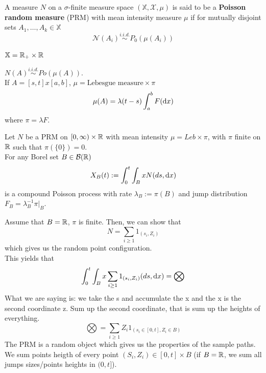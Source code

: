 \documentclass{article}
\begin{document}
	\begin{definition}
		A measure $N$ on a $\sigma$-finite measure space $(\mathbb{X}, \mathcal{X}, \mu)$ is said to be a \textbf{Poisson random measure} (PRM) with mean intensity measure $\mu$ if for mutually disjoint sets $A_1,\dots,A_k \in\mathbb{X} $
		$$\mathcal{N}(A_i) \stackrel{i.i.d.} \sim  P_0(\mu(A_i))$$
	\end{definition} 
	\begin{example}
		$\mathbb{X} = \mathbb{R}_+ \times \mathbb{R}$
		\begin{figure}[H]
			\centering
			
		\end{figure}
		$N(A) \stackrel{i.i.d.} \sim Po(\mu(A))$. \\
		If $A = [s,t] x [a,b] $, $\mu = \text{Lebesgue measure} \times \pi$
		\begin{equation*}
			\mu(A) = \lambda(t-s) \int_a^bF(\mathop{}\!\mathrm{d} x)
		\end{equation*}
		where $\pi = \lambda F$. 
	\end{example}
	\begin{proposition}
		 Let $N$ be a PRM on $[0,\infty) \times \mathbb{R}$ with mean intensity $\mu=Leb \times \pi$, with $\pi$ finite on $\mathbb{R}$ such that $\pi(\{0\}) = 0$. \\
		For any Borel set $B \in \mathcal{B}(\mathbb{R})$ 
		\begin{equation*}
			X_B(t):= \int_0^t \int_B x N(ds,\mathop{}\!\mathrm{d} x) 
		\end{equation*}
		is a compound Poisson process with rate $\lambda_B:= \pi(B)$ and jump distribution $F_B = \lambda_B^{-1} \pi|_B$. 
	\end{proposition}
	\begin{example}
		Assume that $B = \mathbb{R}$, $\pi$ is finite. Then, we can show that 
		\begin{equation*}
			N = \sum_{i \geq 1}1_{(s_i,Z_i)}
		\end{equation*}
		which gives us the random point configuration.\\
		This yields that 
		\begin{equation*}
			\int_0^t \int_B x \sum_{i \geq 1}1_{(s_i,Z_i)} (ds,\mathop{}\!\mathrm{d} x) = \bigotimes
		\end{equation*}
		What we are saying is: we take the s and accumulate the x and the x is the second coordinate z. Sum up the second coordinate, that is sum up the heights of everything.
		$$\bigotimes = \sum_{i\geq1} Z_i 1_{(s_i \in [0,t], Z_i \in B)}$$
		The PRM is a random object which gives us the properties of the sample paths.\\
		We sum points heigth of every point $(S_i, Z_i) \in [0,t] \times B$ (if $B = \mathbb{R}$, we sum all jumps sizes/points heights in $(0,t]$). 
	\end{example}
\end{document}
